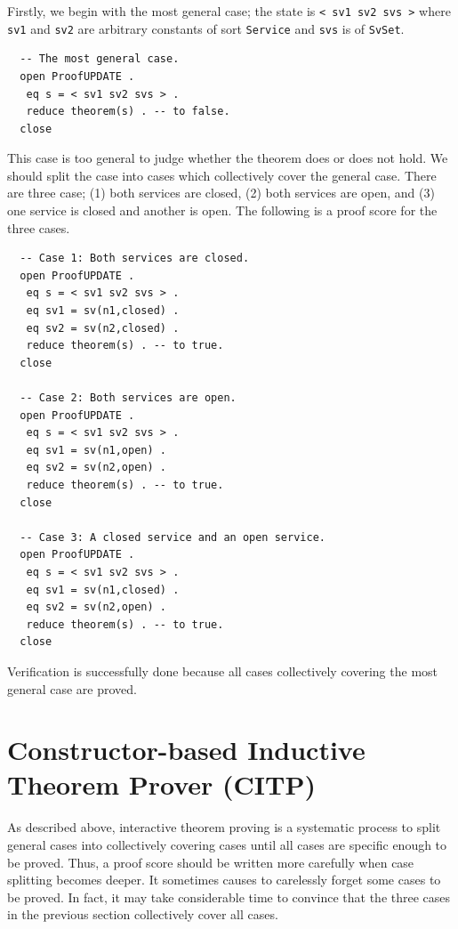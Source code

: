 \documentclass[12pt]{report}
\newcommand{\stt}[1]{{\small{\tt {#1}}}}
\begin{document}
Firstly, we begin with the most general case; the state is
\stt{<~sv1~sv2~svs~>} where {\tt sv1} and {\tt sv2} are arbitrary
constants of sort {\tt Service} and {\tt svs} is of {\tt SvSet}.
\begin{verbatim}
  -- The most general case.
  open ProofUPDATE .
   eq s = < sv1 sv2 svs > .
   reduce theorem(s) . -- to false.
  close
\end{verbatim}
This case is too general to judge whether the theorem does or does not
hold.  We should split the case into cases which collectively cover
the general case.  There are three case; (1) both services are closed,
(2) both services are open, and (3) one service is closed and another
is open. The following is a proof score for the three cases.
\begin{verbatim}
  -- Case 1: Both services are closed.  
  open ProofUPDATE .
   eq s = < sv1 sv2 svs > .  
   eq sv1 = sv(n1,closed) .  
   eq sv2 = sv(n2,closed) .
   reduce theorem(s) . -- to true.  
  close
  
  -- Case 2: Both services are open.
  open ProofUPDATE .
   eq s = < sv1 sv2 svs > .
   eq sv1 = sv(n1,open) .
   eq sv2 = sv(n2,open) .
   reduce theorem(s) . -- to true.
  close
  
  -- Case 3: A closed service and an open service.
  open ProofUPDATE .
   eq s = < sv1 sv2 svs > .
   eq sv1 = sv(n1,closed) .
   eq sv2 = sv(n2,open) .
   reduce theorem(s) . -- to true.
  close
\end{verbatim}
Verification is successfully done because all cases collectively covering
the most general case are proved.
\section{Constructor-based Inductive Theorem Prover (CITP)}
\label{sec:CITP}
As described above, interactive theorem proving is a systematic
process to split general cases into collectively covering cases until
all cases are specific enough to be proved. Thus, a proof score should
be written more carefully when case splitting becomes deeper. It
sometimes causes to carelessly forget some cases to be proved. In
fact, it may take considerable time to convince that the three cases in
the previous section collectively cover all cases.
\end{document}
